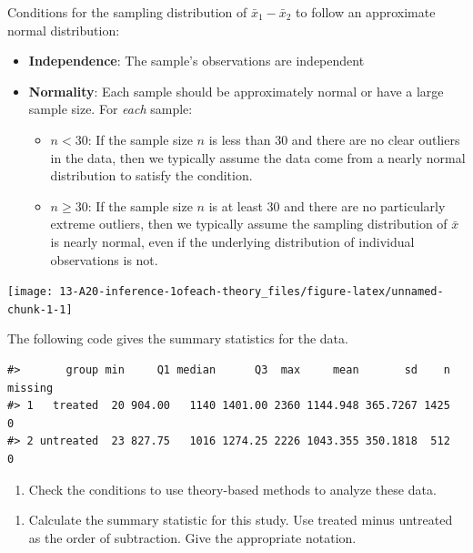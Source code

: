 \documentclass[
]{report}
\providecommand{\tightlist}{%
  \setlength{\itemsep}{0pt}\setlength{\parskip}{0pt}}
\begin{document}
Conditions for the sampling distribution of \(\bar{x}_1-\bar{x}_2\) to follow an approximate normal distribution:

\begin{itemize}
\item
  \textbf{Independence}: The sample's observations are independent
\item
  \textbf{Normality}: Each sample should be approximately normal or have a large sample size. For \emph{each} sample:

  \begin{itemize}
  \item
    \(n < 30\): If the sample size \(n\) is less than 30 and there are no clear outliers in the data, then we typically assume the data come from a nearly normal distribution to satisfy the condition.
  \item
    \(n \ge 30\): If the sample size \(n\) is at least 30 and there are no particularly extreme outliers, then we typically assume the sampling distribution of \(\bar{x}\) is nearly normal, even if the underlying distribution of individual observations is not.
  \end{itemize}
\end{itemize}

\begin{center}\texttt{[image: 13-A20-inference-1ofeach-theory\_files/figure-latex/unnamed-chunk-1-1]} \end{center}

The following code gives the summary statistics for the data.

\begin{verbatim}
#>       group min     Q1 median      Q3  max     mean       sd    n missing
#> 1   treated  20 904.00   1140 1401.00 2360 1144.948 365.7267 1425       0
#> 2 untreated  23 827.75   1016 1274.25 2226 1043.355 350.1818  512       0
\end{verbatim}

\begin{enumerate}
\def\labelenumi{\arabic{enumi}.}
\setcounter{enumi}{2}
\tightlist
\item
  Check the conditions to use theory-based methods to analyze these data.
\end{enumerate}

\vspace{1in}

\begin{enumerate}
\def\labelenumi{\arabic{enumi}.}
\setcounter{enumi}{3}
\tightlist
\item
  Calculate the summary statistic for this study. Use treated minus untreated as the order of subtraction. Give the appropriate notation.
\end{enumerate}
\end{document}
